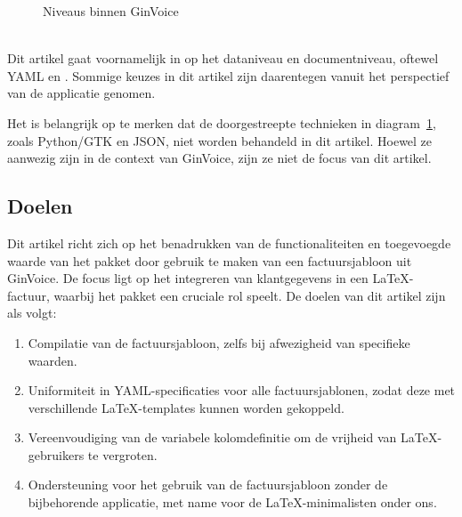 \noindent
\begin{figure}[!ht]
    \centering
    
    \caption{Niveaus binnen GinVoice}\label{fig:scope-bd}
\end{figure}\\
Dit artikel gaat voornamelijk in op het dataniveau en documentniveau, oftewel YAML en \LuaLaTeX.
Sommige keuzes in dit artikel zijn daarentegen vanuit het perspectief van de applicatie genomen.

Het is belangrijk op te merken dat de doorgestreepte technieken in diagram~\ref{fig:scope-bd}, zoals Python/GTK en JSON, niet worden behandeld in dit artikel.
Hoewel ze aanwezig zijn in de context van GinVoice, zijn ze niet de focus van dit artikel.

\subsection{Doelen}
Dit artikel richt zich op het benadrukken van de functionaliteiten en toegevoegde waarde van het  pakket door gebruik te maken van een factuursjabloon uit GinVoice.
De focus ligt op het integreren van klantgegevens in een LaTeX-factuur, waarbij het  pakket een cruciale rol speelt.
De doelen van dit artikel zijn als volgt:
\begin{enumerate}
    \item Compilatie van de factuursjabloon, zelfs bij afwezigheid van specifieke waarden.
    \item Uniformiteit in YAML-specificaties voor alle factuursjablonen, zodat deze met verschillende LaTeX-templates kunnen worden gekoppeld.
    \item Vereenvoudiging van de variabele kolomdefinitie om de vrijheid van LaTeX-gebruikers te vergroten.
    \item Ondersteuning voor het gebruik van de factuursjabloon zonder de bijbehorende applicatie, met name voor de LaTeX-minimalisten onder ons.
\end{enumerate}
